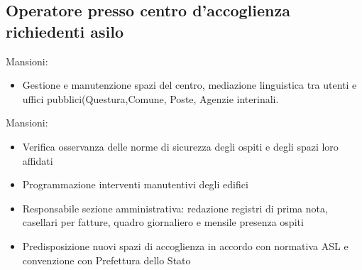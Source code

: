 \documentclass[12pt,a4paper,sans]{moderncv} %
\begin{document}
\subsection{Operatore presso centro d'accoglienza richiedenti asilo}

Mansioni:
\begin{itemize}
\item Gestione e manutenzione spazi del centro, mediazione linguistica tra utenti e uffici pubblici(Questura,Comune, Poste, Agenzie interinali.
\end{itemize}

Mansioni:
\begin{itemize}
\item Verifica osservanza delle norme di sicurezza degli ospiti e degli spazi loro affidati
\item Programmazione interventi manutentivi degli edifici
\item Responsabile sezione amministrativa: redazione registri di prima nota, casellari per fatture, quadro giornaliero e mensile presenza ospiti
\item Predisposizione nuovi spazi di accoglienza in accordo con normativa ASL e convenzione con Prefettura dello Stato
\end{itemize}
\end{document}
